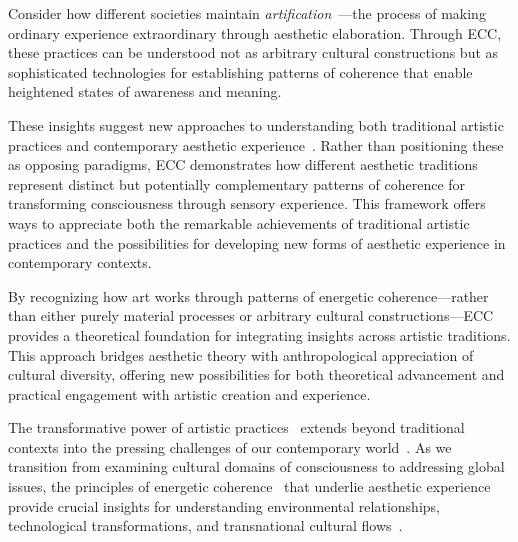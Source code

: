 Consider how different societies maintain \textit{artification}~\cite{dissanayake1992homo,bunn1999nomads}—the process of making ordinary experience extraordinary through aesthetic elaboration. Through ECC, these practices can be understood not as arbitrary cultural constructions but as sophisticated technologies for establishing patterns of coherence that enable heightened states of awareness and meaning.

These insights suggest new approaches to understanding both traditional artistic practices and contemporary aesthetic experience~\cite{coote1992anthropology,throop2003articulating}. Rather than positioning these as opposing paradigms, ECC demonstrates how different aesthetic traditions represent distinct but potentially complementary patterns of coherence for transforming consciousness through sensory experience. This framework offers ways to appreciate both the remarkable achievements of traditional artistic practices and the possibilities for developing new forms of aesthetic experience in contemporary contexts.

By recognizing how art works through patterns of energetic coherence—rather than either purely material processes or arbitrary cultural constructions—ECC provides a theoretical foundation for integrating insights across artistic traditions. This approach bridges aesthetic theory with anthropological appreciation of cultural diversity, offering new possibilities for both theoretical advancement and practical engagement with artistic creation and experience.

The transformative power of artistic practices~ extends beyond traditional contexts into the pressing challenges of our contemporary world~\cite{coote1992anthropology,morphy1991ancestral}. As we transition from examining cultural domains of consciousness to addressing global issues, the principles of energetic coherence~ that underlie aesthetic experience~ provide crucial insights for understanding environmental relationships, technological transformations, and transnational cultural flows~\cite{kapferer2004ritual,ingold2013making}.


